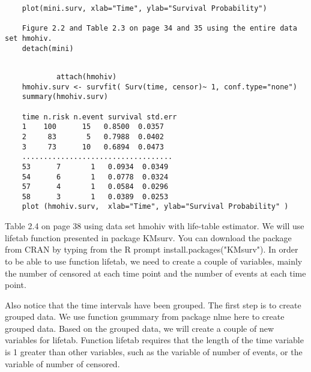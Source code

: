 \begin{frame}	
\begin{framed}
	\begin{verbatim}	
	plot(mini.surv, xlab="Time", ylab="Survival Probability")
	
	Figure 2.2 and Table 2.3 on page 34 and 35 using the entire data set hmohiv.
	detach(mini)

\end{verbatim}
\end{framed}
	\begin{framed}
		\begin{verbatim}
		
			attach(hmohiv)
	hmohiv.surv <- survfit( Surv(time, censor)~ 1, conf.type="none")
	summary(hmohiv.surv)
	
	time n.risk n.event survival std.err
	1    100      15   0.8500  0.0357
	2     83       5   0.7988  0.0402
	3     73      10   0.6894  0.0473
	...................................
	53      7       1   0.0934  0.0349
	54      6       1   0.0778  0.0324
	57      4       1   0.0584  0.0296
	58      3       1   0.0389  0.0253
	plot (hmohiv.surv,  xlab="Time", ylab="Survival Probability" )

\end{verbatim}
\end{framed}
\end{frame}
\begin{frame}
	Table 2.4 on page 38 using data set hmohiv with life-table estimator. We will use lifetab function presented in package KMsurv. You can download the package from CRAN by typing from the R prompt install.packages("KMsurv"). In order to be able to use function lifetab, we need to create a couple of variables, mainly the number of censored at each time point and the number of events at each time point. 
	
\end{frame}
\begin{frame}	
	
	Also notice that the time intervals have been grouped. The first step is to create grouped data. We use function gsummary from package nlme here to create grouped data. Based on the grouped data, we will create a couple of new variables for lifetab. Function lifetab requires that the length of the time variable is 1 greater than other variables, such as the variable of number of events, or the variable of number of censored.
\end{frame}
